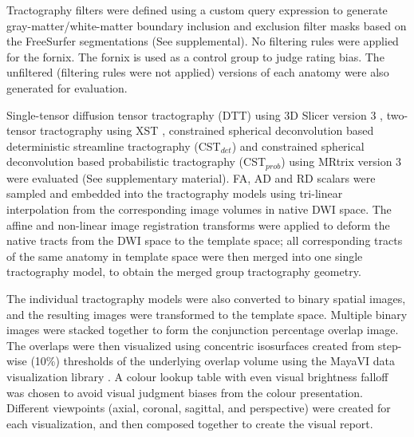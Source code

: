 Tractography filters were defined using a custom query expression to generate gray-matter/white-matter boundary inclusion and exclusion filter masks based on the FreeSurfer segmentations (See supplemental). No filtering rules were applied for the fornix. The fornix is used as a control group to judge rating bias. The unfiltered (filtering rules were not applied) versions of each anatomy were also generated for evaluation. 

Single-tensor diffusion tensor tractography (DTT) using 3D Slicer version 3 \cite{Pieper2006,Tuch2000d}, two-tensor tractography using XST \cite{Qazi2009}, constrained spherical deconvolution based deterministic streamline tractography (CST$_{det}$) \cite{Tournier2012b} and constrained spherical deconvolution based probabilistic tractography (CST$_{prob}$) \cite{Tournier2010} using MRtrix version 3  were evaluated (See supplementary material).  
FA, AD and RD scalars were sampled and embedded into the tractography models using tri-linear interpolation from the corresponding image volumes in native DWI space. The affine and non-linear image registration transforms were applied to deform the native tracts from the DWI space to the template space; all corresponding tracts of the same anatomy in template space were then merged into one single tractography model, to obtain the merged group tractography geometry. 

The individual tractography models were also converted to binary spatial images, and the resulting images were transformed to the template space. Multiple binary images were stacked together to form the conjunction percentage overlap image. The overlaps were then visualized using concentric isosurfaces created from step-wise (10\%) thresholds of the underlying overlap volume using the MayaVI data visualization library \cite{Ramachandran2011}. A colour lookup table with even visual brightness falloff \cite{VanderWalt2015} was chosen to avoid visual judgment biases from the colour presentation. Different viewpoints (axial, coronal, sagittal, and perspective) were created for each visualization, and then composed together to create the visual report. 


